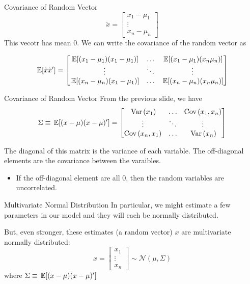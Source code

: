 \documentclass[aspectratio=169,t,11pt,table]{beamer}
\begin{document}
\begin{frame}{Covariance of Random Vector}
  \vspace*{-\bigskipamount}
  $$
    \tilde{x} = \begin{bmatrix} x_1 - \mu_1 \\ \vdots \\ x_n - \mu_n \end{bmatrix}
  $$  
  This vecotr has mean $0$. We can write the covariance of the random vector as

  $$
    \expec{\tilde{x} \tilde{x}'} = 
    \begin{bmatrix}
      \expec{(x_1 - \mu_1) (x_1 - \mu_1)} & \dots & \expec{(x_1 - \mu_1) (x_n \mu_n)} \\
      \vdots & \ddots & \vdots \\
      \expec{(x_n - \mu_n) (x_1 - \mu_1)} & \dots & \expec{(x_n - \mu_n) (x_n \mu_n)} \\
    \end{bmatrix}
  $$
\end{frame}

\begin{frame}{Covariance of Random Vector}
  From the previous slide, we have
  $$
    \Sigma \equiv \expec{(x-\mu) (x-\mu)'} = 
    \begin{bmatrix}
      \var{x_1} & \dots & \cov{x_1, x_n} \\
      \vdots & \ddots & \vdots \\
      \cov{x_n, x_1} & \dots & \var{x_n} \\
    \end{bmatrix}
  $$

  The diagonal of this matrix is the variance of each variable. The off-diagonal elements are the covariance between the varaibles.
  \pause
  \begin{itemize}
    \item If the off-diagonal element are all $0$, then the random variables are uncorrelated.
  \end{itemize}
\end{frame}

\begin{frame}{Multivariate Normal Distribution}
  In particular, we might estimate a few parameters in our model and they will each be normally distributed. 

  \bigskip
  But, even stronger, these estimates (a random vector) $x$ are multivariate normally distributed:
  $$
    x = \begin{bmatrix}x_1 \\ \vdots \\ x_n \end{bmatrix} \sim 
    \mathcal{N}\left( \mu, \Sigma \right)
  $$
  where $\Sigma \equiv \expec{(x-\mu) (x-\mu)'}$
\end{frame}
\end{document}
